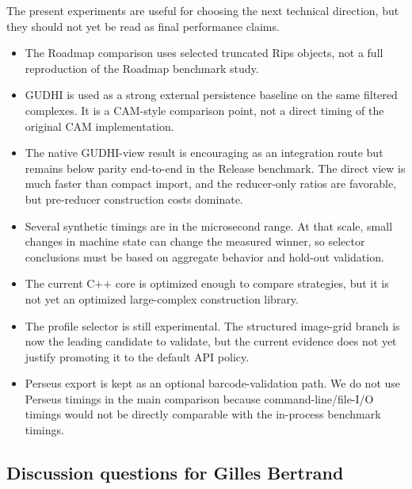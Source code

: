 \documentclass[11pt]{article}
\begin{document}
The present experiments are useful for choosing the next technical direction, but they
should not yet be read as final performance claims.
\begin{itemize}
  \item The Roadmap comparison uses selected truncated Rips objects, not a full
        reproduction of the Roadmap benchmark study.
  \item GUDHI is used as a strong external persistence baseline on the same filtered
        complexes.  It is a CAM-style comparison point, not a direct timing of the
        original CAM implementation.
  \item The native GUDHI-view result is encouraging as an integration route but remains
        below parity end-to-end in the Release benchmark.  The direct view is much faster
        than compact import, and the reducer-only ratios are favorable, but pre-reducer
        construction costs dominate.
  \item Several synthetic timings are in the microsecond range.  At that scale, small
        changes in machine state can change the measured winner, so selector conclusions
        must be based on aggregate behavior and hold-out validation.
  \item The current C++ core is optimized enough to compare strategies, but it is not yet
        an optimized large-complex construction library.
  \item The profile selector is still experimental.  The structured image-grid branch is
        now the leading candidate to validate, but the current evidence does not yet
        justify promoting it to the default API policy.
  \item Perseus export is kept as an optional barcode-validation path.  We do not use
        Perseus timings in the main comparison because command-line/file-I/O timings would
        not be directly comparable with the in-process benchmark timings.
\end{itemize}

\subsection{Discussion questions for Gilles Bertrand}
\end{document}
